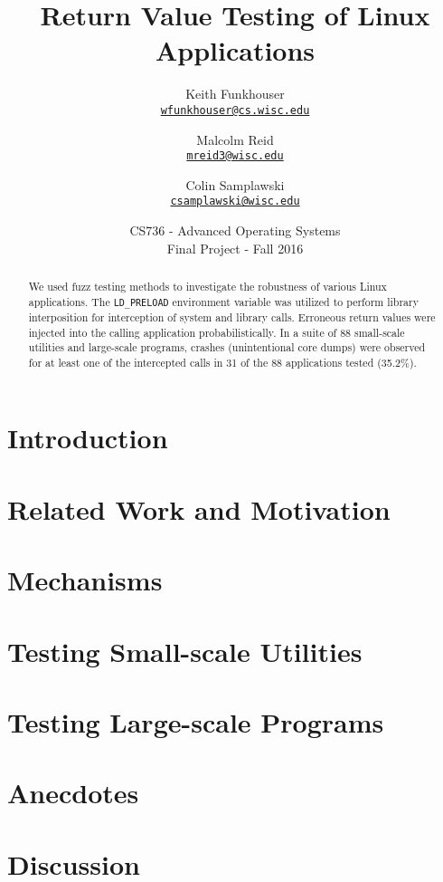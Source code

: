 \documentclass[10pt]{article}
\title{Return Value Testing of Linux Applications}
\author{Keith Funkhouser \\ \texttt{\href{mailto:wfunkhouser@cs.wisc.edu}{wfunkhouser@cs.wisc.edu}}
\and Malcolm Reid\\ \texttt{\href{mailto:mreid3@wisc.edu}{mreid3@wisc.edu}}
\and Colin Samplawski\\ \texttt{\href{mailto:csamplawski@wisc.edu}{csamplawski@wisc.edu}}
}
\date{CS736 - Advanced Operating Systems \\ Final Project - Fall 2016}
\begin{document}
\setlength{\baselineskip}{18pt}
\maketitle

\begin{abstract}
\setlength{\baselineskip}{18pt}
We used fuzz testing methods to investigate the robustness of various Linux applications. The \texttt{LD\_PRELOAD} environment variable was utilized to perform library interposition for interception of system and library calls. Erroneous return values were injected into the calling application probabilistically. In a suite of 88 small-scale utilities and large-scale programs, crashes (unintentional core dumps) were observed for at least one of the intercepted calls in 31 of the 88 applications tested (35.2\%). 
\end{abstract}

\section{Introduction}


\section{Related Work and Motivation}



\section{Mechanisms}



\section{Testing Small-scale Utilities}





\section{Testing Large-scale Programs}


\section{Anecdotes}


\section{Discussion}

\end{document}
